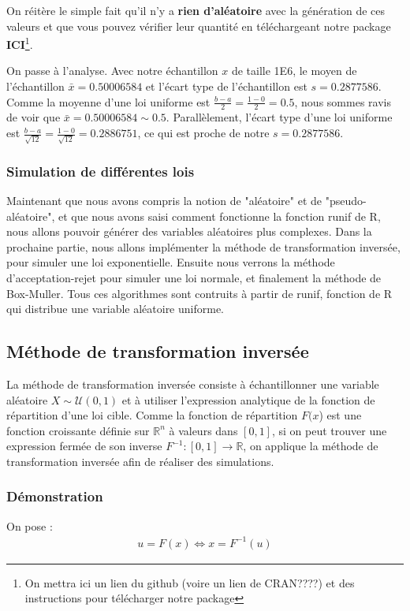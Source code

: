 \documentclass[10pt]{article} %
\begin{document}
On réitère le simple fait qu'il n'y a \textbf{rien d'aléatoire} avec la génération de ces valeurs et que vous pouvez vérifier leur quantité en
téléchargeant notre package \textbf{ICI}\footnote{On mettra ici un lien du github (voire un lien de CRAN????) et des instructions pour télécharger notre package}.

On passe à l'analyse. Avec notre échantillon $x$ de taille 1E6, le moyen de l'échantillon $\bar x = 0.50006584$ et l'écart type de l'échantillon est $s = 0.2877586$.
Comme la moyenne d'une loi uniforme est $\frac{b - a}{2} = \frac{1 - 0}{2} = 0.5$, nous sommes ravis de voir que $\bar x = 0.50006584 \sim 0.5$. Parallèlement, l'écart type
d'une loi uniforme est $\frac{b - a}{\sqrt{12}} = \frac{1 - 0}{\sqrt{12}} = 0.2886751$, ce qui est proche de notre $s = 0.2877586$.


\subsubsection{Simulation de différentes lois}

Maintenant que nous avons compris la notion de "aléatoire" et de "pseudo-aléatoire", et que nous avons saisi comment fonctionne la fonction runif de R, nous allons pouvoir générer des variables aléatoires plus complexes. Dans la prochaine partie, nous allons implémenter la méthode de transformation inversée, pour simuler une loi exponentielle. Ensuite nous verrons la méthode d'acceptation-rejet pour simuler une loi normale, et finalement la méthode de Box-Muller. Tous ces  algorithmes sont contruits à partir de runif, fonction de R qui distribue une variable aléatoire uniforme.

\subsection{Méthode de transformation inversée}

La méthode de transformation inversée consiste à échantillonner une variable aléatoire $X \sim \mathcal{U}(0, 1)$ et à utiliser l'expression analytique
de la fonction de répartition d'une loi cible. Comme la fonction de répartition $F(x$) est une fonction croissante définie sur $\mathbb{R}^n$ à valeurs dans
$[0, 1]$, si on peut trouver une expression fermée de son inverse $F^{-1} : [0, 1] \longrightarrow \mathbb{R}$, on applique la méthode de transformation inversée
afin de réaliser des simulations.

\subsubsection{Démonstration}
On pose :
\begin{align}
u = F(x) \Leftrightarrow x = F^{-1}(u)
\end{align}
\end{document}
